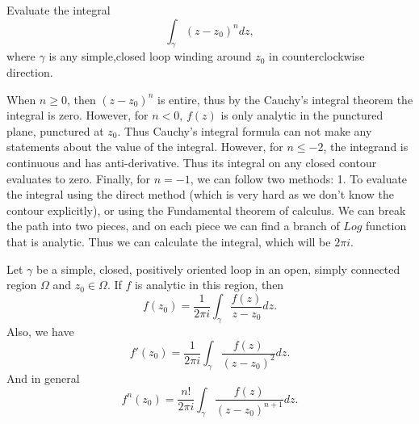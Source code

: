 \begin{exm}
	Evaluate the integral 
	\[ \int_\gamma (z-z_0)^n dz, \] 
	where $\gamma$ is any simple,closed loop winding around $z_0$ in counterclockwise direction.
\end{exm}
\begin{answer}
	When $n\geq0$, then $(z-z_0)^n$ is entire, thus by the Cauchy's integral theorem the integral is zero. However, for $n<0$, $f(z)$ is only analytic in the punctured plane, punctured at $z_0$. Thus Cauchy's integral formula can not make any statements about the value of the integral. However, for $n\leq-2$, the integrand is continuous and has anti-derivative. Thus its integral on any closed contour evaluates to zero. Finally, for $n=-1$, we can follow two methods: 1. To evaluate the integral using the direct method (which is very hard as we don't know the contour explicitly), or using the Fundamental theorem of calculus. We can break the path into two pieces, and on each piece we can find a branch of $Log$ function that is analytic. Thus we can calculate the integral, which will be $2\pi i$.
\end{answer}

\begin{fact}
	Let $\gamma$ be a simple, closed, positively oriented loop in an open, simply connected region $\Omega$ and $z_0 \in \Omega$. If $f$ is analytic in this region, then
	\[ f(z_0) = \frac{1}{2\pi i} \int_\gamma \frac{f(z)}{z-z_0} dz. \]
	Also, we have
	\[ f'(z_0) = \frac{1}{2\pi i} \int_\gamma \frac{f(z)}{(z-z_0)^2}dz. \]
	And in general
	\[ f^{n}(z_0) = \frac{n!}{2\pi i} \int_{\gamma} \frac{f(z)}{(z-z_0)^{n+1}} dz. \]
\end{fact}

